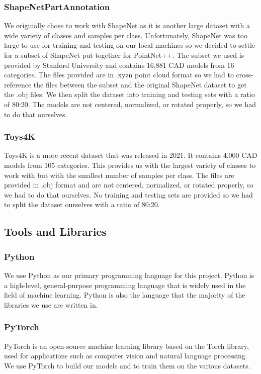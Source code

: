 \documentclass[conference]{IEEEtran}
\begin{document}
\subsubsection{ShapeNetPartAnnotation}
We originally chose to work with ShapeNet \cite{shapenet2015} as it is another large dataset with a wide variety of classes and samples per class. Unfortunately, ShapeNet was too large to use for training and testing on our local machines so we decided to settle for a subset of ShapeNet put together for PointNet++\cite{qi2017pointnetplusplus}. The subset we used is provided by Stanford University and contains 16,881 CAD models from 16 categories. The files provided are in .xyzn point cloud format so we had to cross-reference the files between the subset and the original ShapeNet dataset to get the .obj files. We then split the dataset into training and testing sets with a ratio of 80:20. The models are not centered, normalized, or rotated properly, so we had to do that ourselves.
\subsubsection{Toys4K}
Toys4K \cite{stojanov2021using} is a more recent dataset that was released in 2021. It contains 4,000 CAD models from 105 categories. This provides us with the largest variety of classes to work with but with the smallest number of samples per class. The files are provided in .obj format and are not centered, normalized, or rotated properly, so we had to do that ourselves. No training and testing sets are provided so we had to split the dataset ourselves with a ratio of 80:20.

\subsection{Tools and Libraries}
\subsubsection{Python}
We use Python as our primary programming language for this project. Python is a high-level, general-purpose programming language that is widely used in the field of machine learning. Python is also the language that the majority of the libraries we use are written in.

\subsubsection{PyTorch}
PyTorch \cite{paszke2017automatic} is an open-source machine learning library based on the Torch library, used for applications such as computer vision and natural language processing. We use PyTorch to build our models and to train them on the various datasets.
\end{document}
